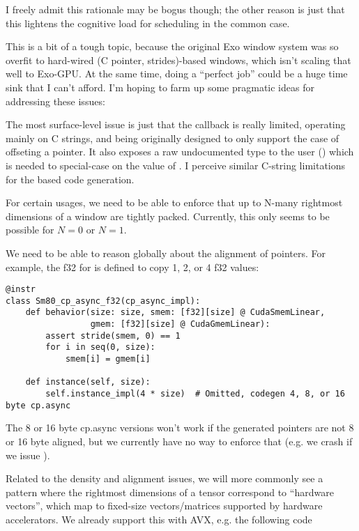 \filbreak
I freely admit this rationale may be bogus though; the other reason is just that this lightens the cognitive load for scheduling in the common case.

\filbreak
{}

This is a bit of a tough topic, because the original Exo window system was so overfit to hard-wired (C pointer, strides)-based windows, which isn't scaling that well to Exo-GPU.
At the same time, doing a ``perfect job'' could be a huge time sink that I can't afford.
I'm hoping to farm up some pragmatic ideas for addressing these issues:

\filbreak
{} The most surface-level issue is just that the  callback is really limited, operating mainly on C strings, and being originally designed to only support the case of offseting a pointer.
It also exposes a raw undocumented  type to the user () which is needed to special-case on the value of .
I perceive similar C-string limitations for the  based  code generation.

\filbreak
{} For certain usages, we need to be able to enforce that up to N-many rightmost dimensions of a window are tightly packed.
Currently, this only seems to be possible for $N=0$ or $N=1$.

\filbreak
{} We need to be able to reason globally about the alignment of pointers.
For example, the f32  for  is defined to copy 1, 2, or 4 f32 values:
{\color{lightttColor}
\begin{verbatim}
@instr
class Sm80_cp_async_f32(cp_async_impl):
    def behavior(size: size, smem: [f32][size] @ CudaSmemLinear,
                 gmem: [f32][size] @ CudaGmemLinear):
        assert stride(smem, 0) == 1
        for i in seq(0, size):
            smem[i] = gmem[i]

    def instance(self, size):
        self.instance_impl(4 * size)  # Omitted, codegen 4, 8, or 16 byte cp.async
\end{verbatim}
}
The 8 or 16 byte cp.async versions won't work if the generated pointers are not 8 or 16 byte aligned, but we currently have no way to enforce that (e.g. we crash if we issue ).

\filbreak
{} Related to the density and alignment issues, we will more commonly see a pattern where the rightmost dimensions of a tensor correspond to ``hardware vectors'', which map to fixed-size vectors/matrices supported by hardware accelerators.
We already support this with AVX, e.g. the following code

